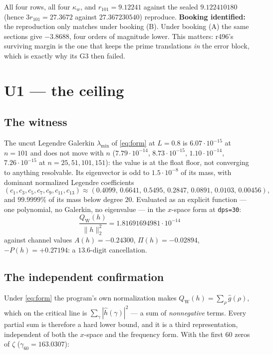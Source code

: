\documentclass[11pt]{article}
\theoremstyle{remark}
\newcommand{\QW}{Q_{\mathrm W}}
\begin{document}
All four rows, all four $\kappa_w$, and
$r_{101}=9.12241$ against the sealed $9.122410180$ (hence
$3r_{101}=27.3672$ against $27.367230540$) reproduce.
\textbf{Booking identified:} the reproduction only matches under
booking (B).  Under booking (A) the same sections give
$-3.8688$, four orders of magnitude lower.  This matters: r496's
surviving margin is the one that keeps the prime translations
\emph{in} the error block, which is exactly why its G3 then failed.

\section{U1 --- the ceiling}\label{sec:ceiling}

\subsection{The witness}

The uncut Legendre Galerkin $\lambda_{\min}$ of \eqref{eq:form} at
$L=0.8$ is $6.07\cdot10^{-15}$ at $n=101$ and does not move with $n$
($7.79\cdot10^{-14}$, $8.73\cdot10^{-15}$, $1.10\cdot10^{-14}$,
$7.26\cdot10^{-15}$ at $n=25,51,101,151$): the value is at the
float floor, not converging to anything resolvable.
Its eigenvector is odd to $1.5\cdot10^{-8}$ of its mass, with
dominant normalized Legendre coefficients
\[
 (c_1,c_3,c_5,c_7,c_9,c_{11},c_{13})
 \approx(0.4099,\,0.6641,\,0.5495,\,0.2847,\,0.0891,\,0.0103,\,0.00456),
\]
and $99.9999\%$ of its mass below degree $20$.  Evaluated as an
explicit function --- one polynomial, no Galerkin, no eigenvalue ---
in the $x$-space form at \texttt{dps=30}:
\[
 \boxed{\ \frac{\QW(h)}{\|h\|_2^2}=1.81691694981\cdot10^{-14}\ }
\]
against channel values $A(h)=-0.24300$, $\Pi(h)=-0.02894$,
$-P(h)=+0.27194$: a $13.6$-digit cancellation.

\subsection{The independent confirmation}

Under \eqref{eq:form} the program's own normalization makes
$\QW(h)=\sum_\rho\widehat g(\rho)$, which on the critical line is
$\sum_\gamma|\widehat h(\gamma)|^2$ --- a sum of \emph{nonnegative}
terms.  Every partial sum is therefore a hard lower bound, and it is
a third representation, independent of both the $x$-space and the
frequency form.  With the first $60$ zeros of $\zeta$
($\gamma_{60}=163.0307$):
\end{document}

